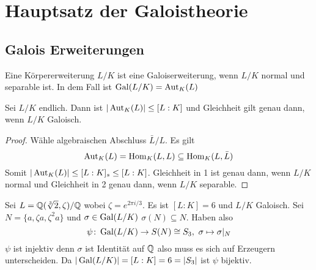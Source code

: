 \chapter{Hauptsatz der Galoistheorie}
\section{Galois Erweiterungen}
\begin{Def}
    Eine Körpererweiterung \(L/K\) ist eine Galoiserweiterung, wenn \(L/K\) normal und separable ist. In dem Fall ist \(\operatorname{Gal}(L/K)=\operatorname{Aut}_K(L)\)
\end{Def}
\begin{Satz}
    Sei \(L/K\) endlich. Dann ist \(|\operatorname{Aut}_K(L)|\leq [L:K]\) und Gleichheit gilt genau dann, wenn \(L/K\) Galoisch.
\end{Satz}
\begin{proof}
    Wähle algebraischen Abschluss \(\bar L/L\). Es gilt 
    \[\operatorname{Aut}_K(L)=\operatorname{Hom}_K(L,L)\subseteq \operatorname{Hom}_K(L,\bar L)\]
    Somit \(|\operatorname{Aut}_K(L)|\leq [L:K]_s\leq [L:K]\).
    Gleichheit in 1 ist genau dann, wenn \(L/K\) normal und Gleichheit in 2 genau dann, wenn \(L/K\) separable.
\end{proof}
\begin{Bsp}
    Sei \(L=\mathbb{Q}(\sqrt[3]{2},\zeta)/\mathbb{Q}\) wobei \(\zeta=e^{2\pi i/3}\). Es ist \([L:K]=6\) und \(L/K\) Galoisch. Sei \(N=\{a,\zeta a,\zeta^2 a\}\) und \(\sigma\in\operatorname{Gal}(L/K)\) \(\sigma(N)\subseteq N\). Haben also 
    \[\psi\colon \operatorname{Gal}(L/K)\to S(N)\cong S_3,\ \sigma\mapsto \sigma|_N\]
    \(\psi\) ist injektiv denn \(\sigma\) ist Identität auf \(\mathbb{Q}\) also muss es sich auf Erzeugern unterscheiden. Da \(|\operatorname{Gal}(L/K)|=[L:K]=6=|S_3|\) ist \(\psi\) bijektiv.
\end{Bsp}
